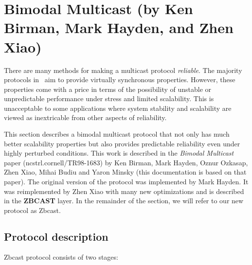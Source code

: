 \section{Bimodal Multicast (by Ken Birman, Mark Hayden, and Zhen
Xiao)}

There are many methods for making a multicast protocol
\emph{reliable}.  The majority protocols in \ensemble\ aim to provide
virtually synchronous properties.  However, these properties come with
a price in terms of the possibility of unstable or unpredictable
performance under stress and limited scalability.  This is
unacceptable to some applications where system stability and
scalability are viewed as inextricable from other aspects of
reliability.

This section describes a bimodal multicast protocol that not only has
much better scalability properties but also provides predictable
reliability even under highly perturbed conditions.  This work is
described in the \emph{Bimodal Multicast} paper
(ncstrl.cornell/TR98-1683) by Ken Birman, Mark Hayden, Oznur Ozkasap,
Zhen Xiao, Mihai Budiu and Yaron Minsky (this documentation is based
on that paper).  The original version of the protocol was implemented
by Mark Hayden.  It was reimplemented by Zhen Xiao with many new
optimizations and is described in the {\bf ZBCAST} layer.  In the
remainder of the section, we will refer to our new protocol as Zbcast.

\subsection{Protocol description}

Zbcast protocol consists of two stages: 

